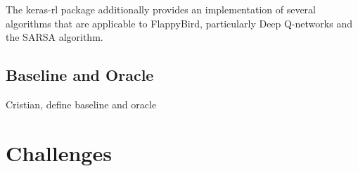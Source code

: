 \documentclass{article}
\begin{document}
The keras-rl package additionally provides an implementation of several algorithms that are applicable to FlappyBird, particularly Deep Q-networks and the SARSA algorithm. 
\subsection{Baseline and Oracle}

Cristian, define baseline and oracle

\section{Challenges}
\end{document}
